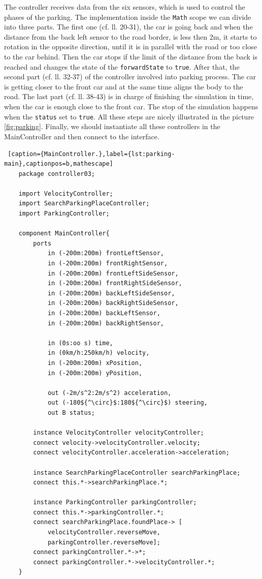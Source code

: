\bigskip
The controller receives data from the six sensors, which is used to control the phases of the parking. The implementation inside the \texttt{Math} scope we can divide into three parts. The first one (cf. ll. 20-31), the car is going back and when the distance from the back left sensor to the road border, is less then 2m, it starts  to rotation in the opposite direction, until it is in parallel with the road or too close to the car behind. Then the car stops if the limit of the distance from the back is reached and changes the state of the \texttt{forwardState} to \texttt{true}. After that, the second part (cf. ll. 32-37) of the controller involved into parking process. The car is getting closer to the front car and at the same time aligns the body to the road. The last part (cf. ll. 38-43) is in charge of finishing the simulation in time, when the car is enough close to the front car. The stop of the simulation happens when the \texttt{status} set to \texttt{true}. All these steps are nicely illustrated in the picture \ref{fig:parking}. 
Finally, we should instantiate all these controllers in the MainController and then connect to the interface.
\bigskip
\begin{lstlisting} [caption={MainController.},label={lst:parking-main},captionpos=b,mathescape]
    package controller03;

    import VelocityController;
    import SearchParkingPlaceController;
    import ParkingController;
    
    component MainController{
        ports 
            in (-200m:200m) frontLeftSensor,
            in (-200m:200m) frontRightSensor,
            in (-200m:200m) frontLeftSideSensor,
            in (-200m:200m) frontRightSideSensor,
            in (-200m:200m) backLeftSideSensor,
            in (-200m:200m) backRightSideSensor,
            in (-200m:200m) backLeftSensor,
            in (-200m:200m) backRightSensor,
    
            in (0s:oo s) time,
            in (0km/h:250km/h) velocity,
            in (-200m:200m) xPosition,
            in (-200m:200m) yPosition,
    
            out (-2m/s^2:2m/s^2) acceleration,
            out (-180${^\circ}$:180${^\circ}$) steering,
            out B status;
    
        instance VelocityController velocityController;
        connect velocity->velocityController.velocity;
        connect velocityController.acceleration->acceleration;
    
        instance SearchParkingPlaceController searchParkingPlace;
        connect this.*->searchParkingPlace.*;
        
        instance ParkingController parkingController;
        connect this.*->parkingController.*;
        connect searchParkingPlace.foundPlace-> [
            velocityController.reverseMove,
            parkingController.reverseMove];
        connect parkingController.*->*;
        connect parkingController.*->velocityController.*;
    }
\end{lstlisting}
